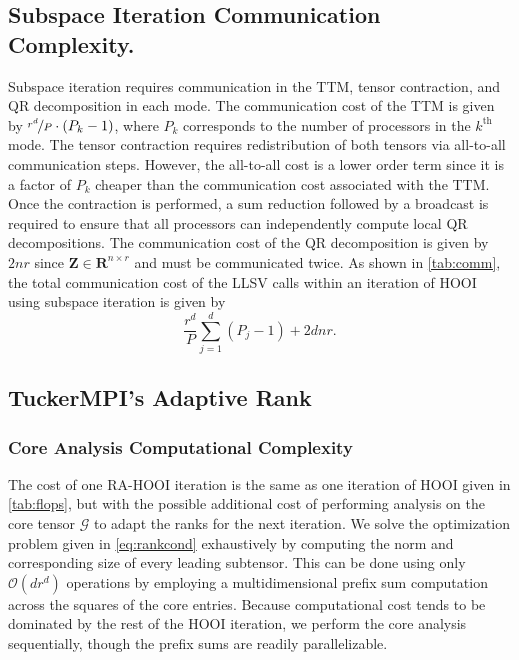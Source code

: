    \subsection{Subspace Iteration Communication Complexity.}
        Subspace iteration requires communication in the TTM, tensor contraction, and QR
        decomposition in each mode. The communication cost of the TTM is given by
        $\nicefrac{r^d}{P}\cdot (P_k - 1)$, where $P_k$ corresponds to the number of
        processors in the $k^\text{th}$ mode. The tensor contraction requires redistribution of
        both tensors via all-to-all communication steps. However, the all-to-all cost is
        a lower order term since it is a factor of $P_k$ cheaper than the communication
        cost associated with the TTM. Once the contraction is performed, a sum reduction
        followed by a broadcast is required to ensure that all processors can
        independently compute local QR decompositions. The communication cost of the QR
        decomposition is given by $2nr$ since $\mathbf{Z} \in \mathbf{R}^{n\times r}$ and must be
        communicated twice. As shown in \cref{tab:comm}, the total communication cost of
        the LLSV calls within an iteration of HOOI using subspace iteration is given by
        \begin{equation*}
            \frac{r^d}{P}\sum_{j=1}^{d}\left(P_j - 1\right) + 2dnr.
        \end{equation*}







\subsection{TuckerMPI's Adaptive Rank} \label{TuckerMPI's Adaptive Rank}
    \subsubsection{Core Analysis Computational Complexity} \label{sec:Core Analysis Computational Complexity}

        The cost of one RA-HOOI iteration is the same as one iteration of HOOI given in
        \cref{tab:flops}, but with the possible additional cost of performing analysis
        on the core tensor $\mathcal{G}$ to adapt the ranks for the next iteration. We solve
        the optimization problem given in \cref{eq:rankcond} exhaustively by computing
        the norm and corresponding size of every leading subtensor. This can be done
        using only $\mathcal O(dr^d)$ operations by employing a multidimensional prefix
        sum computation across the squares of the core entries. Because computational
        cost tends to be dominated by the rest of the HOOI iteration, we perform the
        core analysis sequentially, though the prefix sums are readily parallelizable.

